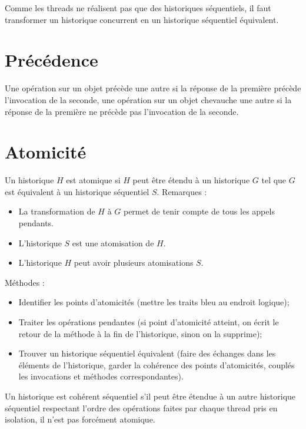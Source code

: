 \documentclass[11pt,a4paper]{report}
\begin{document}
Comme les threads ne réalisent pas que des historiques séquentiels, il faut transformer un historique concurrent en un historique séquentiel équivalent.

\section{Précédence} %
\label{sec:Précédence}

Une opération sur un objet précède une autre si la réponse de la première précède l'invocation de la seconde, une opération sur un objet chevauche une autre si la réponse de la première ne précède pas l'invocation de la seconde.


\section{Atomicité} %
\label{sec:Atomicité}

Un historique $H$ est atomique si $H$ peut être étendu à un historique $G$ tel que $G$ est équivalent à un historique séquentiel $S$. Remarques :
\begin{itemize}
    \item La transformation de $H$ à $G$ permet de tenir compte de tous les appels pendants.
    \item L'historique $S$ est une atomisation de $H$.
    \item L'historique $H$ peut avoir plusieurs atomisations $S$.
\end{itemize}

Méthodes :
\begin{itemize}
    \item Identifier les points d'atomicités (mettre les traits bleu au endroit logique);
    \item Traiter les opérations pendantes (si point d'atomicité atteint, on écrit le retour de la méthode à la fin de l'historique, sinon on la supprime);
    \item Trouver un historique séquentiel équivalent (faire des échanges dans les éléments de l'historique, garder la cohérence des points d'atomicités, couplés les invocations et méthodes correspondantes).
\end{itemize}


Un historique est cohérent séquentiel s'il peut être étendue à un autre historique séquentiel respectant l'ordre des opérations faites par chaque thread pris en isolation, il n'est pas forcément atomique.
\end{document}
